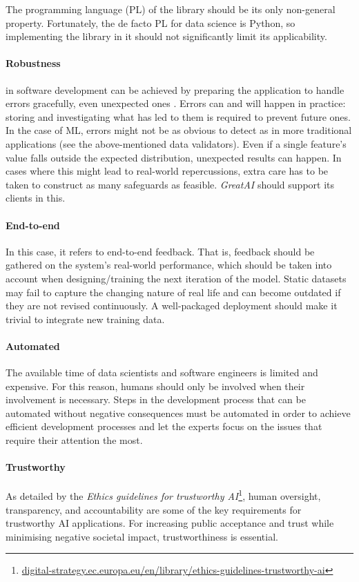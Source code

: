 The programming language (PL) of the library should be its only non-general property. Fortunately, the de facto PL for data science is Python, so implementing the library in it should not significantly limit its applicability.

\paragraph{Robustness} in software development can be achieved by preparing the application to handle errors gracefully, even unexpected ones \cite{bishop1998robust}. Errors can and will happen in practice: storing and investigating what has led to them is required to prevent future ones. In the case of ML, errors might not be as obvious to detect as in more traditional applications (see the above-mentioned data validators). Even if a single feature's value falls outside the expected distribution, unexpected results can happen. In cases where this might lead to real-world repercussions, extra care has to be taken to construct as many safeguards as feasible. \textit{GreatAI} should support its clients in this.

\paragraph{End-to-end} In this case, it refers to end-to-end feedback. That is, feedback should be gathered on the system's real-world performance, which should be taken into account when designing/training the next iteration of the model. Static datasets may fail to capture the changing nature of real life and can become outdated if they are not revised continuously. A well-packaged deployment should make it trivial to integrate new training data.

\paragraph{Automated} The available time of data scientists and software engineers is limited and expensive. For this reason, humans should only be involved when their involvement is necessary. Steps in the development process that can be automated without negative consequences must be automated in order to achieve efficient development processes and let the experts focus on the issues that require their attention the most.

\paragraph{Trustworthy} As detailed by the \textit{Ethics guidelines for trustworthy AI}\footnote{\href{https://digital-strategy.ec.europa.eu/en/library/ethics-guidelines-trustworthy-ai}{digital-strategy.ec.europa.eu/en/library/ethics-guidelines-trustworthy-ai}}, human oversight, transparency, and accountability are some of the key requirements for trustworthy AI applications. For increasing public acceptance and trust while minimising negative societal impact, trustworthiness is essential.

